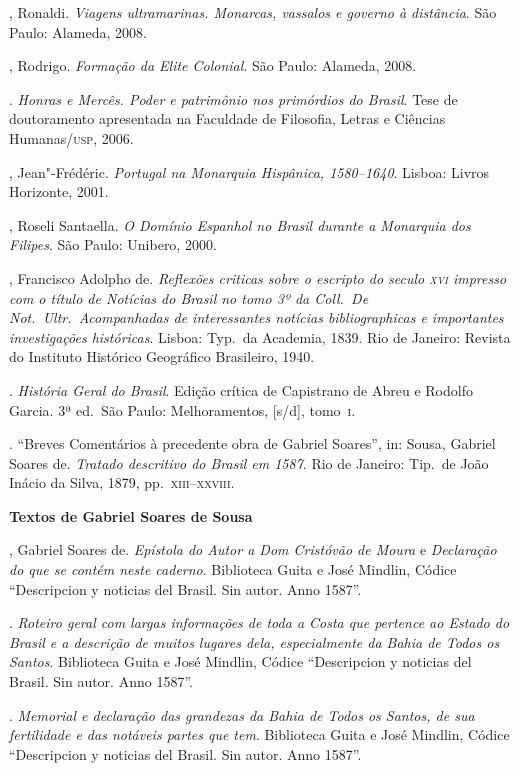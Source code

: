 \begin{bibliohedra}
, Ronaldi. \textit{Viagens ultramarinas. Monarcas, vassalos e governo à distância}. São Paulo: Alameda, 2008.

, Rodrigo. \textit{Formação da Elite Colonial}. São Paulo: Alameda, 2008.

\titidem. \textit{Honras e Mercês. Poder e patrimônio nos primórdios do Brasil}. Tese de doutoramento apresentada na Faculdade de 
Filosofia, Letras e Ciências Humanas/\textsc{usp}, 2006.

, Jean"-Frédéric. \textit{Portugal na Monarquia Hispânica, 1580--1640}. Lisboa: Livros Horizonte, 2001.

, Roseli Santaella. \textit{O Domínio Espanhol no Brasil durante a Monarquia dos Filipes}. São Paulo: Unibero, 2000.

,  Francisco Adolpho de. \textit{Reflexões criticas sobre o escripto do 
seculo \textsc{xvi} impresso com o título de Notícias do Brasil no tomo 3º da Coll.~De Not.~Ultr.~Acompanhadas 
de interessantes notícias bibliographicas e importantes investigações históricas}. 
Lisboa: Typ.~da Academia, 1839. Rio de Janeiro: Revista do Instituto Histórico Geográfico Brasileiro, 1940.

\titidem. \textit{História Geral do Brasil}. Edição crítica de Capistrano 
de Abreu e Rodolfo Garcia. 3ª ed.~São Paulo: Melhoramentos, [s/d], \mbox{tomo \textsc{i}}.

\titidem. “Breves Comentários à precedente obra de Gabriel Soares”, 
in: Sousa, Gabriel Soares de. \textit{Tratado descritivo do Brasil em 1587}. Rio de Janeiro: 
Tip.~de João Inácio da Silva, 1879, pp.~\textsc{xiii--xxviii}.

\vspace*{2ex}

\textbf{Textos de Gabriel Soares de Sousa}

, Gabriel Soares de. \textit{Epístola do Autor a Dom Cristóvão de Moura} e \textit{Declaração do que se contém neste caderno}. 
Biblioteca Guita e José Mindlin, Códice “Descripcion y noticias del Brasil. Sin autor. Anno 1587”.

\titidem. \textit{Roteiro geral com largas informações de toda a Costa que pertence ao Estado do Brasil e a descrição 
de muitos lugares dela, especialmente da Bahia de Todos os Santos}. Biblioteca Guita e José Mindlin, 
Códice “Descripcion y noticias del Brasil. Sin autor. Anno 1587”.

\titidem. \textit{Memorial e declaração das grandezas da Bahia de Todos os Santos, de sua 
fertilidade e das notáveis partes que tem}. Biblioteca Guita e José Mindlin, 
Códice “Descripcion y noticias del Brasil. Sin autor. Anno 1587”.


\end{bibliohedra}
